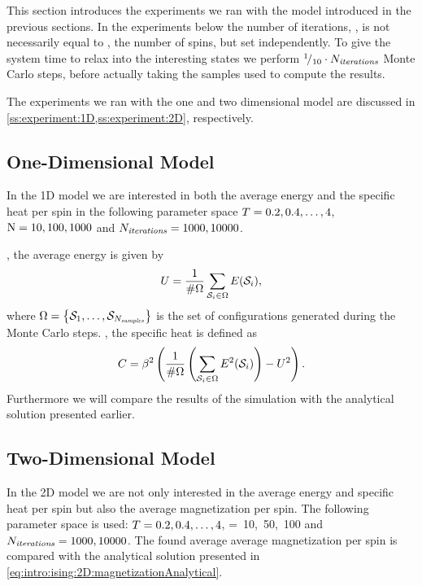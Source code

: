 This section introduces the experiments we ran with the model introduced in the previous sections. In the experiments below the number of iterations, \numberOfIterations, is not necessarily equal to \numberOfSpins, the number of spins, but set independently. To give the system time to relax into the interesting states we perform \mbox{${}^{1}\!/_{10} \cdot N_\textit{iterations}$} Monte Carlo steps, before actually taking the samples used to compute the results. 

 The experiments we ran with the one and two dimensional model are discussed in \cref{ss:experiment:1D,ss:experiment:2D}, respectively.

\subsection{One-Dimensional Model}
\label{ss:experiment:1D}
	In the 1D model we are interested in both the average energy and the specific heat per spin in the following parameter space \mbox{$T = 0.2, 0.4, \dotsc, 4$}, \mbox{$\mathrm{N}=10,100,1000$} and \mbox{$N_\textit{iterations}=1000,10000$}. 

	\averageEnergy, the average energy is given by
	\begin{equation*}
		U = \frac{1}{\#\Omega} \sum_{\mathcal{S}_{i} \in \Omega} E(\mathcal{S}_{i}),
	\end{equation*}
	where $\Omega = \left\{ \mathcal{S}_{1}, \dotsc, \mathcal{S}_{N_\textit{samples}} \right\}$ is the set of configurations generated during the Monte Carlo steps. \specificHeat, the specific heat is defined as
	\begin{equation*}
		C = \beta^2 \left( 
			\frac{1}{\#\Omega} \left(  \sum_{\mathcal{S}_{i} \in \Omega} E^2(\mathcal{S}_{i})\right) - U^2 
		\right).
	\end{equation*}
	Furthermore we will compare the results of the simulation with the analytical solution presented earlier.

\subsection{Two-Dimensional Model}
\label{ss:experiment:2D}
	In the 2D model we are not only interested in the average energy and specific heat per spin but also the average magnetization per spin.  The following parameter space is used: \mbox{$T = 0.2, 0.4, \dotsc, 4$}, \mbox{\numberOfSpins = 10, 50, 100} and $N_\textit{iterations} = 1000, 10000$. The found average average magnetization per spin is compared with the analytical solution presented in \cref{eq:intro:ising:2D:magnetizationAnalytical}.

